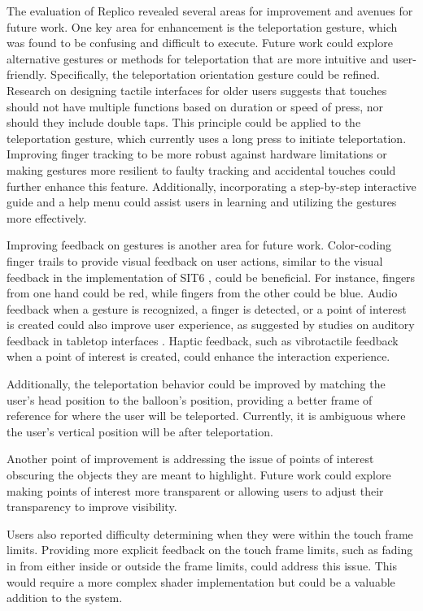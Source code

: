     The evaluation of Replico revealed several areas for improvement and avenues for future work. One key area for enhancement is the teleportation gesture, which was found to be confusing and difficult to execute. Future work could explore alternative gestures or methods for teleportation that are more intuitive and user-friendly. Specifically, the teleportation orientation gesture could be refined. Research on designing tactile interfaces for older users \cite{elderly} suggests that touches should not have multiple functions based on duration or speed of press, nor should they include double taps. This principle could be applied to the teleportation gesture, which currently uses a long press to initiate teleportation. Improving finger tracking to be more robust against hardware limitations or making gestures more resilient to faulty tracking and accidental touches could further enhance this feature. Additionally, incorporating a step-by-step interactive guide and a help menu could assist users in learning and utilizing the gestures more effectively.

    Improving feedback on gestures is another area for future work. Color-coding finger trails to provide visual feedback on user actions, similar to the visual feedback in the implementation of SIT6 \cite{almeidaSIT6IndirectTouchbased2023}, could be beneficial. For instance, fingers from one hand could be red, while fingers from the other could be blue. Audio feedback when a gesture is recognized, a finger is detected, or a point of interest is created could also improve user experience, as suggested by studies on auditory feedback in tabletop interfaces \cite{auditoryAwareness}. Haptic feedback, such as vibrotactile feedback when a point of interest is created, could enhance the interaction experience.

    Additionally, the teleportation behavior could be improved by matching the user's head position to the balloon's position, providing a better frame of reference for where the user will be teleported. Currently, it is ambiguous where the user's vertical position will be after teleportation.

    Another point of improvement is addressing the issue of points of interest obscuring the objects they are meant to highlight. Future work could explore making points of interest more transparent or allowing users to adjust their transparency to improve visibility.

    Users also reported difficulty determining when they were within the touch frame limits. Providing more explicit feedback on the touch frame limits, such as fading in from either inside or outside the frame limits, could address this issue. This would require a more complex shader implementation but could be a valuable addition to the system.

